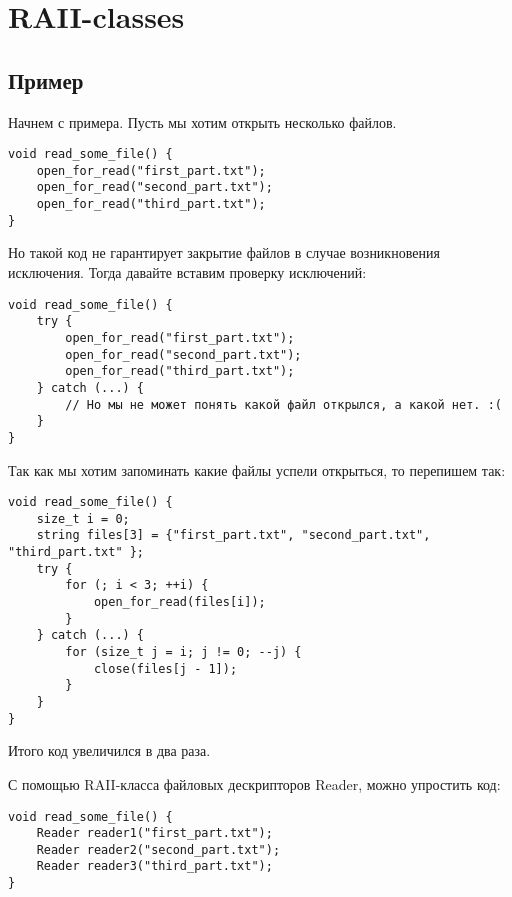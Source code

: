 \section{RAII-classes}
\subsection{Пример}
Начнем с примера. Пусть мы хотим открыть несколько файлов.

\begin{verbatim}
void read_some_file() {
    open_for_read("first_part.txt");
    open_for_read("second_part.txt");
    open_for_read("third_part.txt");
}
\end{verbatim}

Но такой код не гарантирует закрытие файлов в случае возникновения исключения.
Тогда давайте вставим проверку исключений:
\begin{verbatim}
void read_some_file() {
    try {
        open_for_read("first_part.txt");
        open_for_read("second_part.txt");
        open_for_read("third_part.txt");
    } catch (...) {
        // Но мы не может понять какой файл открылся, а какой нет. :(
    }
}
\end{verbatim}

Так как мы хотим запоминать какие файлы успели открыться, то перепишем так:

\begin{verbatim}
void read_some_file() {
    size_t i = 0;
    string files[3] = {"first_part.txt", "second_part.txt", "third_part.txt" };
    try {
        for (; i < 3; ++i) {
            open_for_read(files[i]);
        }
    } catch (...) {
        for (size_t j = i; j != 0; --j) {
            close(files[j - 1]);
        }
    }
}
\end{verbatim}

Итого код увеличился в два раза.

С помощью RAII-класса файловых дескрипторов Reader, можно упростить код:

\begin{verbatim}
void read_some_file() {
    Reader reader1("first_part.txt");
    Reader reader2("second_part.txt");
    Reader reader3("third_part.txt");
}
\end{verbatim}

